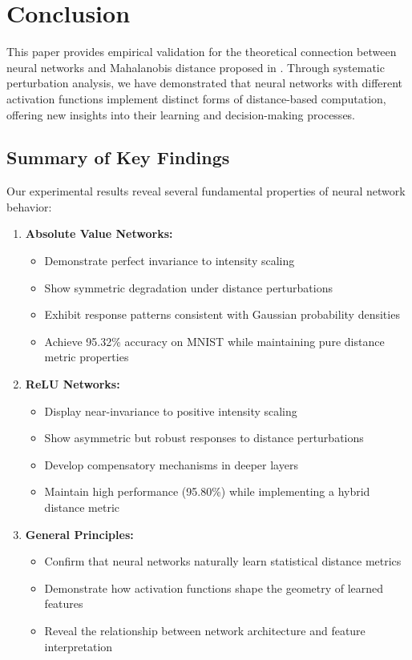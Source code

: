\section{Conclusion}

This paper provides empirical validation for the theoretical connection between neural networks and Mahalanobis distance proposed in \cite{oursland2024interpreting}. Through systematic perturbation analysis, we have demonstrated that neural networks with different activation functions implement distinct forms of distance-based computation, offering new insights into their learning and decision-making processes.

\subsection{Summary of Key Findings}

Our experimental results reveal several fundamental properties of neural network behavior:

\begin{enumerate}
    \item \textbf{Absolute Value Networks:}
    \begin{itemize}
        \item Demonstrate perfect invariance to intensity scaling
        \item Show symmetric degradation under distance perturbations
        \item Exhibit response patterns consistent with Gaussian probability densities
        \item Achieve 95.32\% accuracy on MNIST while maintaining pure distance metric properties
    \end{itemize}

    \item \textbf{ReLU Networks:}
    \begin{itemize}
        \item Display near-invariance to positive intensity scaling
        \item Show asymmetric but robust responses to distance perturbations
        \item Develop compensatory mechanisms in deeper layers
        \item Maintain high performance (95.80\%) while implementing a hybrid distance metric
    \end{itemize}

    \item \textbf{General Principles:}
    \begin{itemize}
        \item Confirm that neural networks naturally learn statistical distance metrics
        \item Demonstrate how activation functions shape the geometry of learned features
        \item Reveal the relationship between network architecture and feature interpretation
    \end{itemize}
\end{enumerate}

